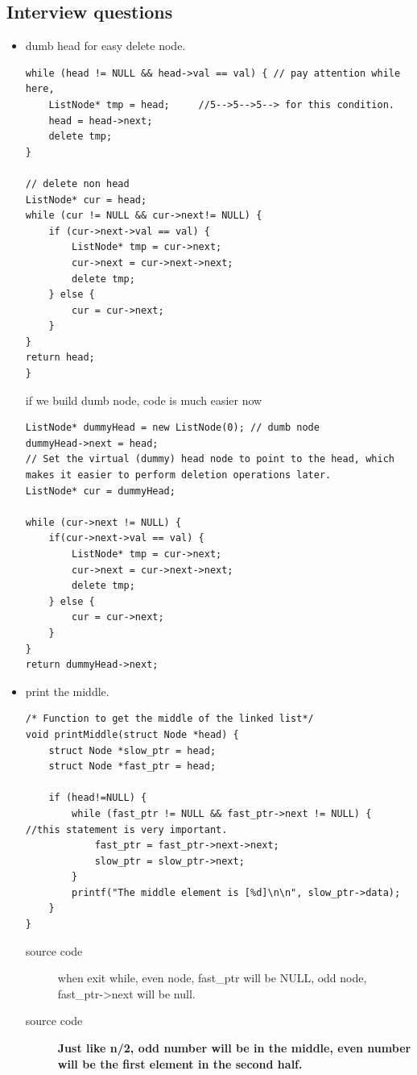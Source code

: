 \documentclass[a4paper,11pt,twoside]{book}
\begin{document}
\subsection{Interview questions}
\begin{itemize}
	\item dumb head for easy delete node.
\begin{lstlisting}
while (head != NULL && head->val == val) { // pay attention while here, 
	ListNode* tmp = head;     //5-->5-->5--> for this condition.
	head = head->next;
	delete tmp;
}

// delete non head 
ListNode* cur = head;
while (cur != NULL && cur->next!= NULL) {
	if (cur->next->val == val) {
		ListNode* tmp = cur->next;
		cur->next = cur->next->next;
		delete tmp;
	} else {
		cur = cur->next;
	}
}
return head;
}
\end{lstlisting}
if we build dumb node, code is much easier now
\begin{lstlisting}
ListNode* dummyHead = new ListNode(0); // dumb node
dummyHead->next = head; 
// Set the virtual (dummy) head node to point to the head, which makes it easier to perform deletion operations later.
ListNode* cur = dummyHead;

while (cur->next != NULL) {
	if(cur->next->val == val) {
		ListNode* tmp = cur->next;
		cur->next = cur->next->next;
		delete tmp;
	} else {
		cur = cur->next;
	}
}
return dummyHead->next;
\end{lstlisting}
	
	\item print the middle. 
\begin{lstlisting}[breaklines]
/* Function to get the middle of the linked list*/
void printMiddle(struct Node *head) { 
	struct Node *slow_ptr = head; 
	struct Node *fast_ptr = head; 

	if (head!=NULL) {		 
		while (fast_ptr != NULL && fast_ptr->next != NULL) {  //this statement is very important.
			fast_ptr = fast_ptr->next->next; 
			slow_ptr = slow_ptr->next; 
		} 
		printf("The middle element is [%d]\n\n", slow_ptr->data); 
	} 
} 
\end{lstlisting}
\begin{description}
	\item[source code] when exit while, even node, fast\_ptr will be NULL, odd node, fast\_ptr->next will be null.
	\item[source code] \textbf{Just like n/2, odd number will be in the middle, even number will be the first element in the second half.}
\end{description}
	

\end{itemize}
\end{document}
